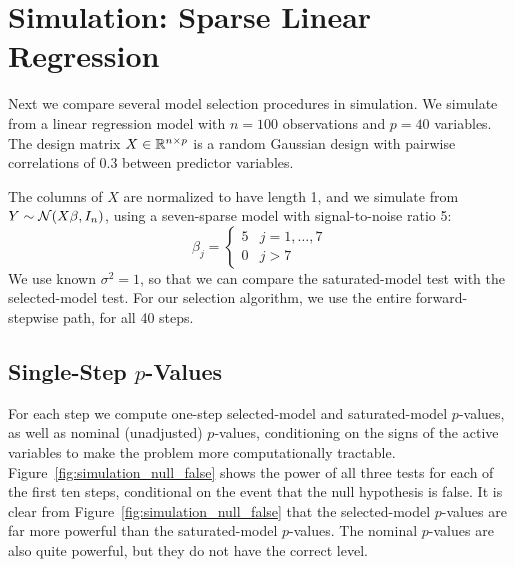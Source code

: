 \documentclass{article}
\begin{document}
\section{Simulation: Sparse Linear Regression}
\label{sec:sparseReg}

Next we compare several model selection procedures in simulation. We simulate from a linear regression model with $n=100$ observations and $p=40$ variables. The design matrix $X\in\mathbb{R}^{n\times p}$ is a random Gaussian design with pairwise correlations of 0.3 between predictor variables.

The columns of $X$ are normalized to have length 1, and we simulate from $Y \sim \mathcal{N}(X\beta,I_n)$, using a seven-sparse model with signal-to-noise ratio 5:
\[
\beta_j = \left\{\begin{matrix}5 & j = 1,\ldots,7\\ 0 &
    j>7\end{matrix}\right.
\]
We use known $\sigma^2=1$, so that we can compare the saturated-model test with the selected-model test. For our selection algorithm, we use the entire forward-stepwise path, for all 40 steps. 

\subsection{Single-Step $p$-Values}

For each step we compute one-step selected-model and saturated-model $p$-values, as well as nominal (unadjusted) $p$-values, conditioning on the signs of the active variables to make the problem more computationally tractable. Figure~\ref{fig:simulation_null_false} shows the power of all three tests for each of the first ten steps, conditional on the event that the null hypothesis is false. It is clear from Figure~\ref{fig:simulation_null_false} that the selected-model $p$-values are far more powerful than the saturated-model $p$-values. The nominal $p$-values are also quite powerful, but they do not have the correct level.
\end{document}
